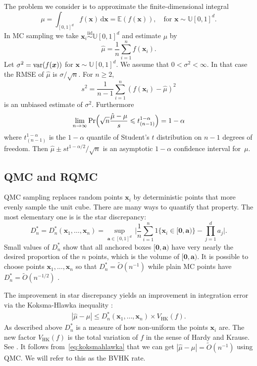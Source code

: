 \documentclass{article}
\newcommand{\art}[1]{\begingroup\color{blue}#1\endgroup}
\newcommand{\fred}[1]{\begingroup\color{red}#1\endgroup}
\renewcommand{\le}{\leqslant}
\renewcommand{\ge}{\geqslant}
\newcommand{\e}{\mathbb{E}}
\newcommand{\bsa}{\boldsymbol{a}}
\newcommand{\bsx}{\boldsymbol{x}}
\newcommand{\bszero}{\boldsymbol{0}}
\newcommand{\simiid}{\stackrel{\mathrm{iid}}{\sim}}
\newcommand{\dunif}{\mathbb{U}}
\newcommand{\hk}{\mathrm{HK}}
\newcommand{\rd}{\,\mathrm{d}}
\begin{document}
The problem we consider is to approximate the finite-dimensional
integral
$$\mu = \int_{[0,1]^d}f(\bsx)\rd\bsx 
=\e(f(\bsx)),\quad\text{for $\bsx\sim\dunif[0,1]^d$}.$$
In MC sampling we take $\bsx_i\simiid \dunif[0,1]^d$ and
estimate $\mu$ by
$$
\hat\mu = \frac1n\sum_{i=1}^nf(\bsx_i).
$$
Let $\sigma^2=\var(f(\bsx))$ for $\bsx\sim\dunif[0,1]^d$.
We assume that $0<\sigma^2<\infty$. In that case the RMSE
of $\hat\mu$ is $\sigma/\sqrt{n}$. For $n\ge2$,
$$s^2 =\frac1{n-1}\sum_{i=1}^n(f(\bsx_i)-\hat\mu)^2$$
is an unbiased estimate of $\sigma^2$. Furthermore
$$
\lim_{n\to\infty}\Pr\Bigl( \sqrt{n}\frac{\hat\mu-\mu}s\le t^{1-\alpha}_{(n-1)}\Bigr) = 1-\alpha
$$
where $t^{1-\alpha}_{(n-1)}$ is the $1-\alpha$ quantile of
Student's $t$ distribution on $n-1$ degrees of freedom.
Then $\hat\mu \pm st^{1-\alpha/2}/\sqrt{n}$ is an
asymptotic $1-\alpha$ confidence interval for~$\mu$.

\subsection{QMC and RQMC}

QMC sampling replaces random points $\bsx_i$ by 
deterministic points that more evenly sample the
unit cube.  There are many ways to quantify that 
property. The most elementary one is %
is the
star discrepancy:
$$
D_n^* = D_n^*(\bsx_1,\dots,\bsx_n)=\sup_{\bsa\in[0,1]^d}
\,\biggl| \frac1n\sum_{i=1}^n1\{\bsx_i\in[\bszero,\bsa)\}
-\prod_{j=1}^da_j\biggr|.
$$
Small values of $D_n^*$ show that all anchored boxes $[\bszero,\bsa)$
have very nearly the desired proportion of the $n$ points,
which is the volume of $[\bszero,\bsa)$.
It is possible to choose points $\bsx_1,\dots,\bsx_n$ so
that $D_n^*=\tilde O(n^{-1})$ while plain MC points
have $D_n^*=\tilde O(n^{-1/2})$ \cite{Nie92}.

The improvement in star discrepancy yields an improvement
in integration error via the Koksma-Hlawka inequality \cite{Hic04a}:
\begin{align}\label{eq:koksmahlawka}
|\hat\mu-\mu|\le D_n^*(\bsx_1,\dots,\bsx_n)\times V_{\hk}(f).
\end{align}
As described above $D_n^*$ is a measure of how non-uniform
the points $\bsx_i$ are. The new factor $V_{\hk}(f)$ is the
total variation of $f$ in the sense of Hardy and Krause.
See \cite{Owe05a}. It follows from~\eqref{eq:koksmahlawka} 
that we can get $|\hat\mu-\mu|=\tilde O(n^{-1})$
using QMC. We will refer to this as the BVHK rate.
\end{document}

